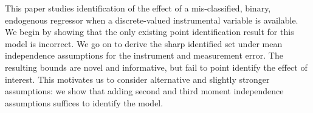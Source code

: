 This paper studies identification of the effect of a mis-classified, binary, endogenous regressor when a discrete-valued instrumental variable is available. 
We begin by showing that the only existing point identification result for this model is incorrect. 
We go on to derive the sharp identified set under mean independence assumptions for the instrument and measurement error.
The resulting bounds are novel and informative, but fail to point identify the effect of interest.
This motivates us to consider alternative and slightly stronger assumptions: we show that adding second and third moment independence assumptions suffices to identify the model.
